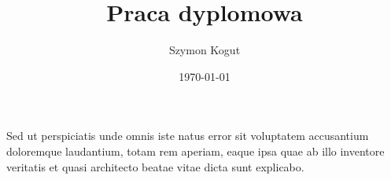 \documentclass[10pt]{book}
\title{Praca dyplomowa}
\author{\Huge Szymon Kogut}
\date{\today}
\renewcommand{\contentsname}{Spis treści}
\begin{document}

\normalsize

\setcounter{page}{-101}

\null
\vfill
\raggedright
\begin{flushright}
  Sed ut perspiciatis unde omnis iste natus error sit voluptatem accusantium doloremque laudantium, totam rem aperiam, eaque ipsa quae ab illo inventore veritatis et quasi architecto beatae vitae dicta sunt explicabo.
\end{flushright}
\newpage


\newpage


\newpage

\renewcommand{\contentsname}{\vspace{-2.5em}Spis treści}
\renewcommand\listfigurename{\vspace{-2.5em}Spis rysunków}
\tableofcontents
\newpage
\listoffigures
\newpage

\setcounter{page}{1}


\newpage


\newpage


\newpage


\newpage


\newpage


\newpage


\newpage


\newpage


\newpage


\newpage


\newpage


\newpage
\end{document}
